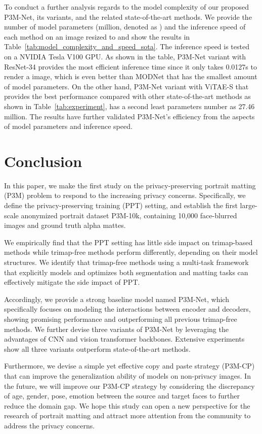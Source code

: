 \documentclass[twocolumn]{svjour3}
\begin{document}
To conduct a further analysis regards to the model complexity of our proposed P3M-Net, its variants, and the related state-of-the-art methods. We provide the number of model parameters (million, denoted as ) and the inference speed of each method on an image resized to  and show the results in Table~\ref{tab:model_complexity_and_speed_sota}. The inference speed is tested on a NVIDIA Tesla V100 GPU. As shown in the table, P3M-Net variant with ResNet-34 provides the most efficient inference time since it only takes 0.0127s to render a  image, which is even better than MODNet that has the smallest amount of model parameters. On the other hand, P3M-Net variant with ViTAE-S that provides the best performance compared with other state-of-the-art methods as shown in Table~\ref{tab:experiment}, has a second least parameters number as 27.46 million. The results have further validated P3M-Net's efficiency from the aspects of model parameters and inference speed. 





\section{Conclusion}\label{sec:conclusion}

In this paper, we make the first study on the privacy-preserving portrait matting (P3M) problem to respond to the increasing privacy concerns. Specifically, we define the privacy-preserving training (PPT) setting, and establish the first large-scale anonymized portrait dataset P3M-10k, containing 10,000 face-blurred images and ground truth alpha mattes. 

We empirically find that the PPT setting has little side impact on trimap-based methods while trimap-free methods perform differently, depending on their model structures. We identify that trimap-free methods using a multi-task framework that explicitly models and optimizes both segmentation and matting tasks can effectively mitigate the side impact of PPT. 

Accordingly, we provide a strong baseline model named P3M-Net, which specifically focuses on modeling the interactions between encoder and decoders, showing promising performance and outperforming all previous trimap-free methods. We further devise three variants of P3M-Net by leveraging the advantages of CNN and vision transformer backbones. Extensive experiments show all three variants outperform state-of-the-art methods. 

Furthermore, we devise a simple yet effective copy and paste strategy (P3M-CP) that can improve the generalization ability of models on non-privacy images. In the future, we will improve our P3M-CP strategy by considering the discrepancy of age, gender, pose, emotion between the source and target faces to further reduce the domain gap. We hope this study can open a new perspective for the research of portrait matting and attract more attention from the community to address the privacy concerns. 

      

\end{document}
